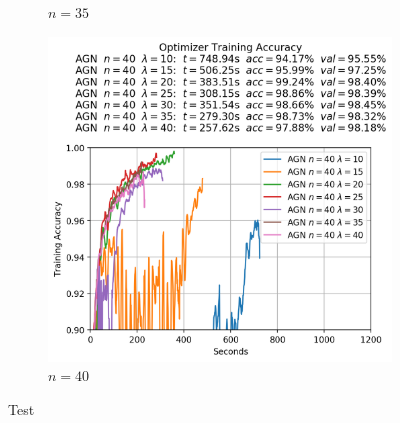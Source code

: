 \begin{figure}
\begin{subfigure}{.3\textwidth}
    \caption{$n = 35$}
  \end{subfigure}
  \begin{subfigure}{.3\textwidth}
    \centering
    \includegraphics[width=\linewidth]{resources/images/agn_experiments_workers_40}
    \caption{$n = 40$}
  \end{subfigure}
  \label{fig:agn_experiments_workers}
  \caption{Test}
\end{figure}

